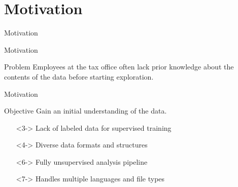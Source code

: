 \section{Motivation}
\begin{frame}{Motivation} 
\end{frame}

\begin{frame}{Motivation} 
    \begin{alertblock}{Problem} 
    Employees at the tax office often lack prior knowledge about the contents of the data before starting exploration.
    \end{alertblock}

\end{frame}


\begin{frame}{Motivation} 
    \begin{exampleblock}{Objective} 
    Gain an initial understanding of the data.
    \end{exampleblock}

    \begin{itemize}
        \item[\ding{55}]<3-> Lack of labeled data for supervised training
        \item[\ding{55}]<4-> Diverse data formats and structures
    \end{itemize}

    \begin{itemize}
        \item[\ding{51}]<6-> Fully unsupervised analysis pipeline
        \item[\ding{51}]<7-> Handles multiple languages and file types
    \end{itemize}
\end{frame}